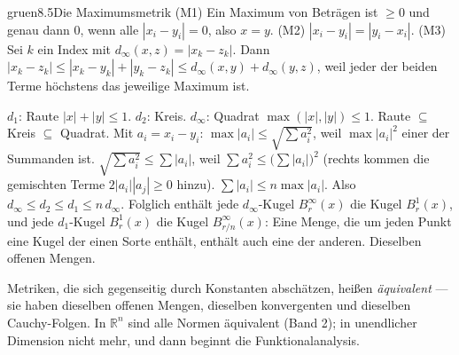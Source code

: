 \begin{loesungkarte}{gruen}{8.5}{Die Maximumsmetrik}
(M1) Ein Maximum von Beträgen ist $\ge0$ und genau dann $0$, wenn alle $|x_i - y_i| = 0$, also $x = y$. (M2) $|x_i - y_i| = |y_i - x_i|$. (M3) Sei $k$ ein Index mit $d_\infty(x, z) = |x_k - z_k|$. Dann $|x_k - z_k|\le|x_k - y_k| + |y_k - z_k|\le d_\infty(x, y) + d_\infty(y, z)$, weil jeder der beiden Terme höchstens das jeweilige Maximum ist. \checkmark
{}
\begin{center}
\end{center}
$d_1$: Raute $|x| + |y|\le1$. $d_2$: Kreis. $d_\infty$: Quadrat $\max(|x|, |y|)\le1$. Raute $\subseteq$ Kreis $\subseteq$ Quadrat.
Mit $a_i = x_i - y_i$: $\max|a_i|\le\sqrt{\sum a_i^{2}}$, weil $\max|a_i|^{2}$ einer der Summanden ist. $\sqrt{\sum a_i^{2}}\le\sum|a_i|$, weil $\sum a_i^{2}\le\bigl(\sum|a_i|\bigr)^{2}$ (rechts kommen die gemischten Terme $2|a_i||a_j|\ge0$ hinzu). $\sum|a_i|\le n\max|a_i|$. Also $d_\infty\le d_2\le d_1\le n\,d_\infty$. Folglich enthält jede $d_\infty$-Kugel $B^{\infty}_r(x)$ die Kugel $B^{1}_r(x)$, und jede $d_1$-Kugel $B^{1}_r(x)$ die Kugel $B^{\infty}_{r/n}(x)$: Eine Menge, die um jeden Punkt eine Kugel der einen Sorte enthält, enthält auch eine der anderen. Dieselben offenen Mengen. \checkmark
{}
\begin{mitnehmen}\kastentext
Metriken, die sich gegenseitig durch Konstanten abschätzen, heißen \emph{äquivalent} --- sie haben dieselben offenen Mengen, dieselben konvergenten und dieselben Cauchy-Folgen. In $\mathbb R^{n}$ sind alle Normen äquivalent (Band 2); in unendlicher Dimension nicht mehr, und dann beginnt die Funktionalanalysis.
\end{mitnehmen}
\end{loesungkarte}

